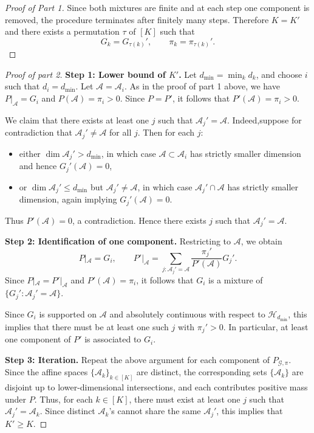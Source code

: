 \documentclass[bj,authoryear]{imsart}
\theoremstyle{plain}
\theoremstyle{remark}
\def\cA{\mathcal{A}}
\def\cG{\mathcal{G}}
\def\cH{\mathcal{H}}
\begin{document}
\begin{appendix}
\begin{proof}[Proof of Part 1]
Since both mixtures are finite and at each step one component is removed, the procedure terminates after finitely many steps. Therefore $K=K'$ and there exists a permutation $\tau$ of $[K]$ such that
\[
G_k = G_{\tau(k)}', \qquad \pi_k = \pi_{\tau(k)}'.
\]
\end{proof}

\begin{proof}[Proof of part 2]
    \noindent
    \textbf{Step 1: Lower bound of $K'$.} Let $d_{\min}=\min_k d_k$, and choose $i$ such that $d_i=d_{\min}$. Let $\cA=\cA_i$. As in the proof of part 1 above, we have $P|_{\cA}=G_i$ and $P(\cA)=\pi_i>0$. Since $P=P'$, it follows that $P'(\cA)=\pi_i>0$.

    We claim that there exists at least one $j$ such that $\cA_j'=\cA$. Indeed,suppose for contradiction that $\cA_j' \neq \cA$ for all $j$. Then for each $j$:
    \begin{itemize}
    \item either $\dim \cA_j' > d_{\min}$, in which case $\cA \subset \cA_i$ has strictly smaller dimension and hence $G_j'(\cA)=0$,
    \item or $\dim \cA_j' \le d_{\min}$ but $\cA_j' \neq \cA$, in which case $\cA_j' \cap \cA$ has strictly smaller dimension, again implying $G_j'(\cA)=0$.
\end{itemize}
Thus $P'(\cA)=0$, a contradiction. Hence there exists $j$ such that $\cA_j' = \cA$.

\medskip

\noindent
\textbf{Step 2: Identification of one component.}
Restricting to $\cA$, we obtain
\[
P|_{\cA} = G_i, \qquad P'|_{\cA} = \sum_{j: \cA_j' = \cA} \frac{\pi_j'}{P'(\cA)} G_j'.
\]
Since $P|_{\cA} = P'|_{\cA}$ and $P'(\cA)=\pi_i$, it follows that $G_i$ is a mixture of $\{G_j': \cA_j' = \cA\}$.

Since $G_i$ is supported on $\cA$ and absolutely continuous with respect to $\cH_{d_{\min}}$, this implies that there must be at least one such $j$ with $\pi_j' > 0$. In particular, at least one component of $P'$ is associated to $G_i$.
\medskip

\noindent
\textbf{Step 3: Iteration.}
Repeat the above argument for each component of $P_{\cG,\pi}$. Since the affine spaces $\{\cA_k\}_{k\in[K]}$ are distinct, the corresponding sets $\{\cA_k\}$ are disjoint up to lower-dimensional intersections, and each contributes positive mass under $P$. Thus, for each $k\in[K]$, there must exist at least one $j$ such that $\cA_j' = \cA_k$. Since distinct $\cA_k$'s cannot share the same $\cA_j'$, this implies that $K' \ge K$.


\end{proof}
\end{appendix}
\end{document}
